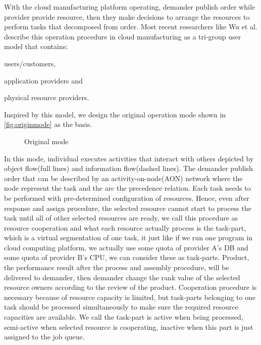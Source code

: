 With the cloud manufacturing platform operating, demander publish order while provider provide resource, then they make decisions to  arrange the resources to perform tasks that decomposed from order. Most recent researchers like Wu et al.\cite{Wu2013} describe this operation procedure in cloud manufacturing as a tri-group user model that contains:\begin{inparaenum}[1)]
\item users/customers,
\item application providers and
\item physical resource providers.
\end{inparaenum}
Inspired by this model, we design the original operation mode shown in \autoref{fig:originmode} as the basis.
\begin{figure}[htbp]
    \centering
    \resizebox{0.9\textwidth}{!}{}
    \caption{Original mode}
    \label{fig:originmode}
\end{figure}
In this mode, individual executes activities that interact with others depicted by object flow(full lines) and information flow(dashed lines). The demander publish order that can be described by an activity-on-node(AON) network where the node represent the task and the arc the precedence relation. Each task needs to be performed with pre-determined configuration of resources. Hence, even after response and assign procedure, the selected resource cannot start to process the task until all of other selected resources are ready, we call this procedure as resource cooperation and what each resource actually process is the task-part, which is a virtual segmentation of one task, it just like if we run one program in cloud computing platform, we actually use some quota of provider A's DB and some quota of provider B's CPU, we can consider these as task-parts. Product, the performance result after the process and assembly procedure, will be delivered to demander, then demander change the rank value of the selected resource owners according to the review of the product. Cooperation procedure is necessary because of resource capacity is limited, but task-parts belonging to one task should be processed simultaneously to make sure the required resource capacities are available. We call the task-part is active when being processed, semi-active when selected resource is cooperating, inactive when this part is just assigned to the job queue.

